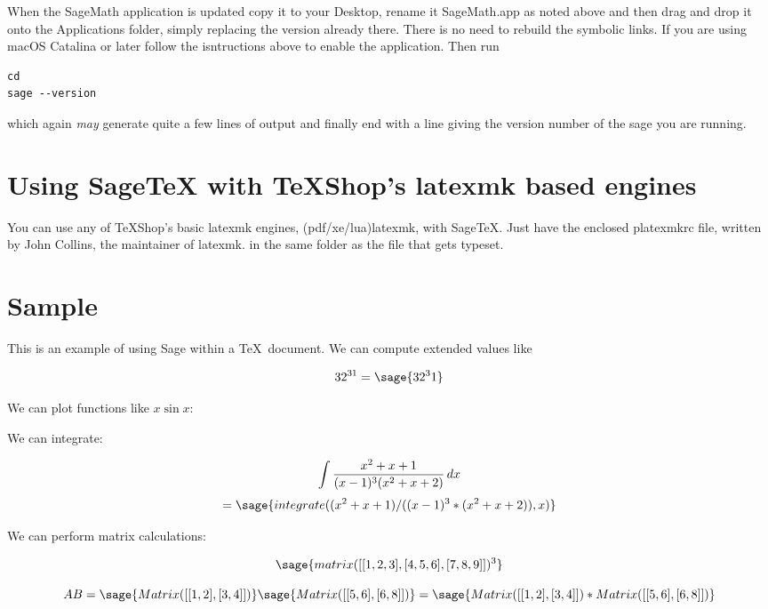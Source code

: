 \documentclass[11pt, oneside]{amsart}
\newcommand{\TS}{\textsf{\TeX Shop}}
\begin{document}
When the \textsf{SageMath} application is updated copy it to your \textsf{Desktop}, rename it  \textsf{SageMath.app} as noted above and then drag and drop it onto the \textsf{Applications} folder, simply replacing the version already there. There is no need to rebuild the symbolic links. If you are using \textsf{macOS Catalina} or later follow the isntructions above to enable the application. Then run
{\footnotesize\begin{verbatim}
cd
sage --version
\end{verbatim}
}
which again \emph{may} generate quite a few lines of output and finally end with a line giving the version number of the \textsf{sage} you are running.

\section{Using \textsf{SageTeX} with \TS's \textsf{latexmk} based engines}

You can use any of \TS's basic \textsf{latexmk} engines, \textsf{(pdf/xe/lua)latexmk}, with \textsf{SageTeX}. Just have the enclosed \textsf{platexmkrc} file, written by John Collins, the maintainer of \textsf{latexmk}. in the same folder as the file that gets typeset.

\section{Sample}

This is an example of using Sage within a \TeX\ document. We can compute extended values like 

	$$32^{31} = \sage{32^31}$$
	
We can plot functions like $x \sin x$:

\begin{center}
\end{center}

\newpage 
 We can integrate:
 
 $$\int {{x^2 + x + 1} \over {(x - 1)^3 (x^2 + x + 2)}}\,dx$$
 $$=  \sage{integrate( (x^2 + x + 1) / ((x - 1)^3 * (x^2 + x + 2)), x )}$$
 
 We can perform matrix calculations:
 
$$\sage{matrix([[1, 2, 3], [4, 5, 6], [7, 8, 9]])^3}$$

$$AB=  \sage{Matrix([[1, 2], [3, 4]])} \sage{Matrix([[5, 6], [6, 8]])} = \sage{Matrix([[1, 2], [3, 4]]) * Matrix([[5, 6], [6, 8]])}$$
\end{document}

